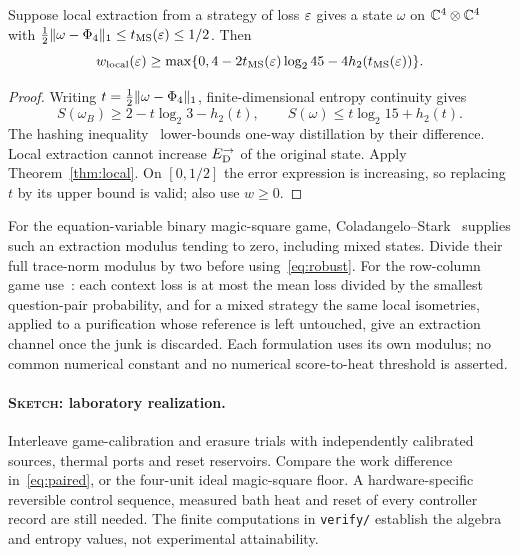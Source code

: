 \begin{proposition}\label{prop:robust}
Suppose local extraction from a strategy of loss $\varepsilon$ gives a state $\omega$ on $\mathbb C^4\otimes\mathbb C^4$ with $\frac12\lVert\omega-\Phi_4\rVert_1\le t_{\rm MS}(\varepsilon)\le1/2$. Then
\begin{equation}
 w_{\rm local}(\varepsilon)\ge
 \max\{0,4-2t_{\rm MS}(\varepsilon)\log_2 45-4h_2(t_{\rm MS}(\varepsilon))\}.\label{eq:robust}
\end{equation}
\end{proposition}
\begin{proof}
Writing $t=\frac12\lVert\omega-\Phi_4\rVert_1$, finite-dimensional entropy continuity gives
\[
 S(\omega_B)\ge2-t\log_2 3-h_2(t),\qquad
 S(\omega)\le t\log_2 15+h_2(t).
\]
The hashing inequality~\cite[Theorem 10]{dw} lower-bounds one-way distillation by their difference. Local extraction cannot increase $E_{\mathrm D}^{\to}$ of the original state. Apply Theorem~\ref{thm:local}. On $[0,1/2]$ the error expression is increasing, so replacing $t$ by its upper bound is valid; also use $w\ge0$.
\end{proof}

For the equation-variable binary magic-square game, Coladangelo--Stark~\cite[Definition 4.14 and Theorem 6.9, arXiv v2]{cs} supplies such an extraction modulus tending to zero, including mixed states. Divide their full trace-norm modulus by two before using~\eqref{eq:robust}. For the row-column game use~\cite[Appendix C, Lemma C.1 and equations (C18)--(C35), arXiv v2]{wu}: each context loss is at most the mean loss divided by the smallest question-pair probability, and for a mixed strategy the same local isometries, applied to a purification whose reference is left untouched, give an extraction channel once the junk is discarded. Each formulation uses its own modulus; no common numerical constant and no numerical score-to-heat threshold is asserted.

\paragraph{\textnormal{\textsc{Sketch}}: laboratory realization.}
Interleave game-calibration and erasure trials with independently calibrated sources, thermal ports and reset reservoirs. Compare the work difference in~\eqref{eq:paired}, or the four-unit ideal magic-square floor. A hardware-specific reversible control sequence, measured bath heat and reset of every controller record are still needed. The finite computations in \texttt{verify/} establish the algebra and entropy values, not experimental attainability.

